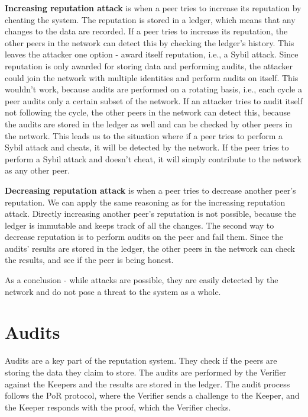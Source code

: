\textbf{Increasing reputation attack} is when a peer tries to increase its reputation by
cheating the system.
The reputation is stored in a ledger, which means that any changes to the data are recorded.
If a peer tries to increase its reputation, the other peers in the network can detect this by
checking the ledger's history.
This leaves the attacker one option - award itself reputation, i.e., a Sybil attack.
Since reputation is only awarded for storing data and performing audits, the attacker could join the network
with multiple identities and perform audits on itself.
This wouldn't work, because audits are performed on a rotating basis, i.e., each cycle a peer audits only a 
certain subset of the network.
If an attacker tries to audit itself not following the cycle, the other peers in the network can detect this,
because the audits are stored in the ledger as well and can be checked by other peers in the network.
This leads us to the situation where if a peer tries to perform a Sybil attack and cheats, it will be detected by
the network.
If the peer tries to perform a Sybil attack and doesn't cheat,
it will simply contribute to the network as any other peer.

\textbf{Decreasing reputation attack} is when a peer tries to decrease another peer's reputation.
We can apply the same reasoning as for the increasing reputation attack.
Directly increasing another peer's reputation is not possible, because the ledger is immutable and keeps track of
all the changes.
The second way to decrease reputation is to perform audits on the peer and fail them.
Since the audits' results are stored in the ledger, the other peers in the network can check the results,
and see if the peer is being honest.

As a conclusion - while attacks are possible, they are easily detected by the network
and do not pose a threat to the system as a whole.

\section{Audits}

Audits are a key part of the reputation system.
They check if the peers are storing the data they claim to store.
The audits are performed by the Verifier against the Keepers and the results are stored in the ledger.
The audit process follows the PoR protocol, where the Verifier sends a challenge to the Keeper,
and the Keeper responds with the proof, which the Verifier checks.

